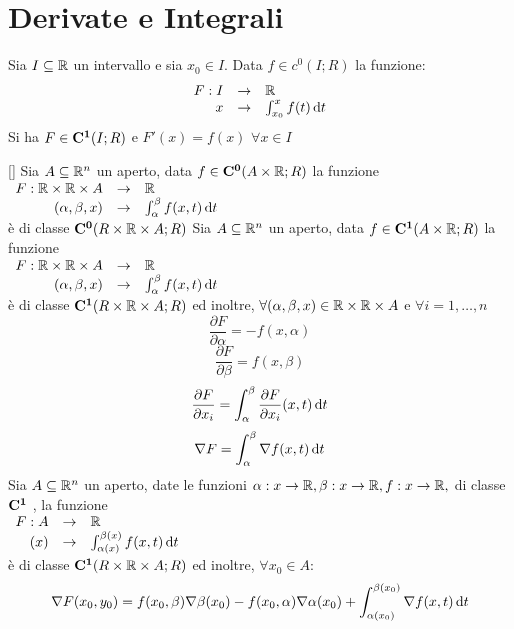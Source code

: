 \section{Derivate e Integrali}
\begin{proposition}
	\label{teo:fondament_calcolo_integ}
	Sia $I\subseteq \mathbb{R}$ un intervallo e sia $x_0\in I$. Data $f\in c^0(I;R)$ la funzione:
	\[\begin{array}{rcl} F: I & \to & \mathbb{R} \\ x & \to & \int_{x_0}^{x}f(t)\,\mathrm{d}{t} \end{array}\]
	Si ha $F\in \mathbf{C^{1}}(I;R)$ e $F'(x)=f(x)$ $\forall x \in I$
\end{proposition}[]
\proposition
Sia $A\subseteq \mathbb{R}^n$ un aperto, data $f\in \mathbf{C^{0}}(A\times \mathbb{R};R)$ la funzione \\
$\begin{array}{rcl} F: \mathbb{R}\times \mathbb{R}\times A & \to & \mathbb{R} \\ (\alpha,\beta,x) & \to & \int_{\alpha}^{\beta}f(x,t)\,\mathrm{d}{t} \end{array}$\\
è di classe $\mathbf{C^{0}}(R\times \mathbb{R}\times A;R)$
\proposition
Sia $A\subseteq \mathbb{R}^n$ un aperto, data $f\in \mathbf{C^{1}}(A\times \mathbb{R};R)$ la funzione \\
$\begin{array}{rcl} F: \mathbb{R}\times \mathbb{R}\times A & \to & \mathbb{R} \\ (\alpha,\beta,x) & \to & \int_{\alpha}^{\beta}f(x,t)\,\mathrm{d}{t} \end{array}$\\
è di classe $\mathbf{C^{1}}(R\times \mathbb{R}\times A;R)$ ed inoltre, $\forall (\alpha,\beta,x)\in \mathbb{R}\times \mathbb{R}\times A$ e $\forall i=1,\ldots,n$\\
\[\frac{\partial F}{\partial \alpha}=-f(x,\alpha)\]
\[\frac{\partial F}{\partial \beta}=f(x,\beta)\]
\[\frac{\partial F}{\partial x_i}=\int_{\alpha}^{\beta}\frac{\partial F}{\partial x_i}(x,t)\,\mathrm{d}{t}\]
\[\nabla F=\int_{\alpha}^{\beta}\nabla f(x,t)\,\mathrm{d}{t}\]
\corollary
Sia $A\subseteq \mathbb{R}^n$ un aperto, date le funzioni $\alpha:x \to \mathbb{R}, \beta:x \to \mathbb{R}, f:x \to \mathbb{R}, $ di classe $\mathbf{C^{1}}$ , la funzione \\
$\begin{array}{rcl} F: A & \to & \mathbb{R} \\ (x) & \to & \int_{\alpha(x)}^{\beta(x)}f(x,t)\,\mathrm{d}{t} \end{array}$\\
è di classe $\mathbf{C^{1}}(R\times \mathbb{R}\times A;R)$ ed inoltre, $\forall x_0 \in A$:
\[\nabla F(x_0,y_0)=f(x_0,\beta)\nabla\beta(x_0)-f(x_0,\alpha)\nabla\alpha(x_0)+\int_{\alpha(x_0)}^{\beta(x_0)}\nabla f(x,t)\,\mathrm{d}{t}\]


